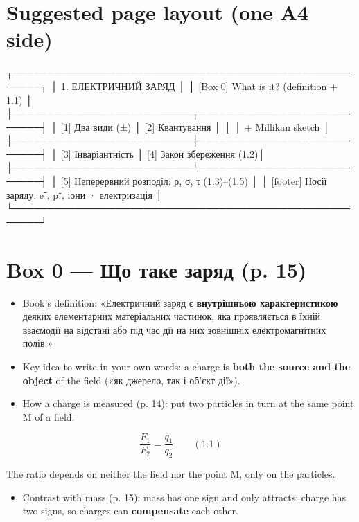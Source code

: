 \documentclass[11pt,a4paper,oneside]{book}
\begin{document}
\section*{Suggested page layout (one A4 side)}

\begin{layout}
┌──────────────────────────────────────────────────────┐
│ 1. ЕЛЕКТРИЧНИЙ ЗАРЯД                                  │
│ [Box 0] What is it? (definition + 1.1)                │
├──────────────────────────┬───────────────────────────┤
│ [1] Два види (±)         │ [2] Квантування            │
│                          │     + Millikan sketch      │
├──────────────────────────┼───────────────────────────┤
│ [3] Інваріантність       │ [4] Закон збереження (1.2)│
├──────────────────────────┴───────────────────────────┤
│ [5] Неперервний розподіл: ρ, σ, τ  (1.3)–(1.5)        │
│ [footer] Носії заряду: e⁻, p⁺, іони · електризація     │
└──────────────────────────────────────────────────────┘
\end{layout}

\par\noindent{\color{accent!30}\rule{\linewidth}{0.4pt}}\par

\section*{Box 0 — Що таке заряд (p. 15)}

\begin{itemize}
\item Book's definition: «Електричний заряд є \textbf{внутрішньою характеристикою} деяких елементарних матеріальних частинок, яка проявляється в їхній взаємодії на відстані або під час дії на них зовнішніх електромагнітних полів.»
\item Key idea to write in your own words: a charge is \textbf{both the source and the object} of the field («як джерело, так і об'єкт дії»).
\item How a charge is measured (p. 14): put two particles in turn at the same point M of a field:
\end{itemize}

\[\frac{F_1}{F_2} = \frac{q_1}{q_2} \qquad (1.1)\]

The ratio depends on neither the field nor the point M, only on the particles.
\begin{itemize}
\item Contrast with mass (p. 15): mass has one sign and only attracts; charge has two signs, so charges can \textbf{compensate} each other.
\end{itemize}
\end{document}
